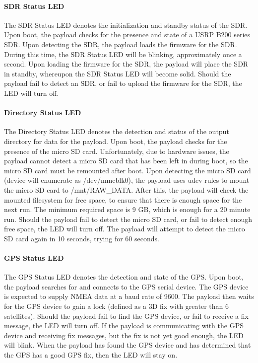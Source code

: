 \documentclass{report}
\begin{document}
								\paragraph{SDR Status LED}
									The SDR Status LED denotes the initialization and standby status of the SDR.  Upon boot, the payload checks for the presence and state of a USRP B200 series SDR.  Upon detecting the SDR, the payload loads the firmware for the SDR.  During this time, the SDR Status LED will be blinking, approximately once a second.  Upon loading the firmware for the SDR, the payload will place the SDR in standby, whereupon the SDR Status LED will become solid.  Should the payload fail to detect an SDR, or fail to upload the firmware for the SDR, the LED will turn off.
								\paragraph{Directory Status LED}
									The Directory Status LED denotes the detection and status of the output directory for data for the payload.  Upon boot, the payload checks for the presence of the micro SD card.  Unfortunately, due to hardware issues, the payload cannot detect a micro SD card that has been left in during boot, so the micro SD card must be remounted after boot.  Upon detecting the micro SD card (device will enumerate as /dev/mmcblk0), the payload uses udev rules to mount the micro SD card to /mnt/RAW\_DATA.  After this, the payload will check the mounted filesystem for free space, to ensure that there is enough space for the next run.  The minimum required space is 9 GB, which is enough for a 20 minute run.  Should the payload fail to detect the micro SD card, or fail to detect enough free space, the LED will turn off.  The payload will attempt to detect the micro SD card again in 10 seconds, trying for 60 seconds.
								\paragraph{GPS Status LED}
									The GPS Status LED denotes the detection and state of the GPS.  Upon boot, the payload searches for and connects to the GPS serial device.  The GPS device is expected to supply NMEA data at a baud rate of 9600.  The payload then waits for the GPS device to gain a lock (defined as a 3D fix with greater than 6 satellites).  Should the payload fail to find the GPS device, or fail to receive a fix message, the LED will turn off.  If the payload is communicating with the GPS device and receiving fix messages, but the fix is not yet good enough, the LED will blink.  When the payload has found the GPS device and has determined that the GPS has a good GPS fix, then the LED will stay on.
\end{document}
